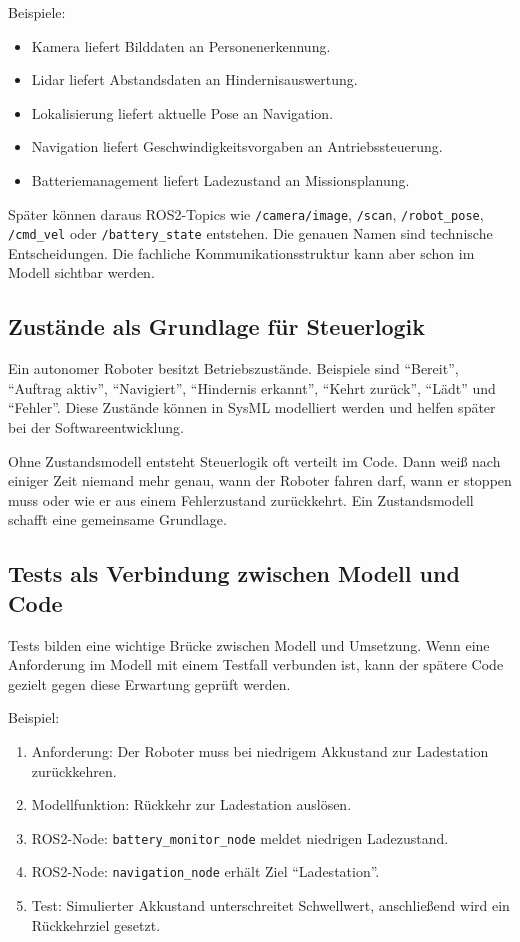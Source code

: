 Beispiele:

\begin{itemize}
    \item Kamera liefert Bilddaten an Personenerkennung.
    \item Lidar liefert Abstandsdaten an Hindernisauswertung.
    \item Lokalisierung liefert aktuelle Pose an Navigation.
    \item Navigation liefert Geschwindigkeitsvorgaben an Antriebssteuerung.
    \item Batteriemanagement liefert Ladezustand an Missionsplanung.
\end{itemize}

Später können daraus ROS2-Topics wie \texttt{/camera/image}, \texttt{/scan}, \texttt{/robot\_pose}, \texttt{/cmd\_vel} oder \texttt{/battery\_state} entstehen. Die genauen Namen sind technische Entscheidungen. Die fachliche Kommunikationsstruktur kann aber schon im Modell sichtbar werden.

\subsection{Zustände als Grundlage für Steuerlogik}
Ein autonomer Roboter besitzt Betriebszustände. Beispiele sind \enquote{Bereit}, \enquote{Auftrag aktiv}, \enquote{Navigiert}, \enquote{Hindernis erkannt}, \enquote{Kehrt zurück}, \enquote{Lädt} und \enquote{Fehler}. Diese Zustände können in SysML modelliert werden und helfen später bei der Softwareentwicklung.

Ohne Zustandsmodell entsteht Steuerlogik oft verteilt im Code. Dann weiß nach einiger Zeit niemand mehr genau, wann der Roboter fahren darf, wann er stoppen muss oder wie er aus einem Fehlerzustand zurückkehrt. Ein Zustandsmodell schafft eine gemeinsame Grundlage.

\subsection{Tests als Verbindung zwischen Modell und Code}
Tests bilden eine wichtige Brücke zwischen Modell und Umsetzung. Wenn eine Anforderung im Modell mit einem Testfall verbunden ist, kann der spätere Code gezielt gegen diese Erwartung geprüft werden.

Beispiel:

\begin{enumerate}
    \item Anforderung: Der Roboter muss bei niedrigem Akkustand zur Ladestation zurückkehren.
    \item Modellfunktion: Rückkehr zur Ladestation auslösen.
    \item ROS2-Node: \texttt{battery\_monitor\_node} meldet niedrigen Ladezustand.
    \item ROS2-Node: \texttt{navigation\_node} erhält Ziel \enquote{Ladestation}.
    \item Test: Simulierter Akkustand unterschreitet Schwellwert, anschließend wird ein Rückkehrziel gesetzt.
\end{enumerate}

